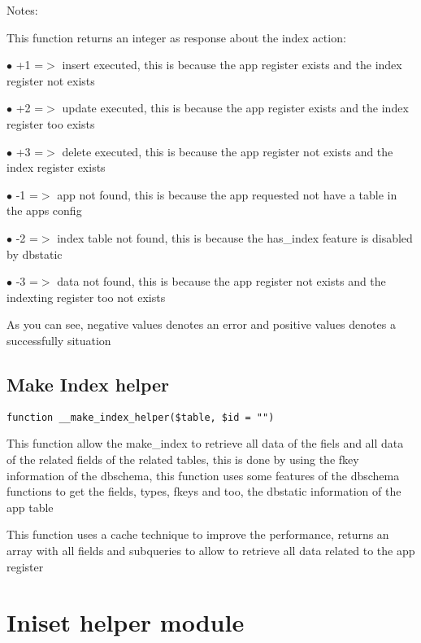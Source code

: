 \documentclass[a4paper]{book}
\begin{document}
Notes:

This function returns an integer as response about the index action:

\begin{compactitem}
\item[\color{myblue}$\bullet$] +1 =$>$ insert executed, this is because the app register exists and the index register not exists
\item[\color{myblue}$\bullet$] +2 =$>$ update executed, this is because the app register exists and the index register too exists
\item[\color{myblue}$\bullet$] +3 =$>$ delete executed, this is because the app register not exists and the index register exists
\item[\color{myblue}$\bullet$] -1 =$>$ app not found, this is because the app requested not have a table in the apps config
\item[\color{myblue}$\bullet$] -2 =$>$ index table not found, this is because the has\_index feature is disabled by dbstatic
\item[\color{myblue}$\bullet$] -3 =$>$ data not found, this is because the app register not exists and the indexting register too not exists
\end{compactitem}

As you can see, negative values denotes an error and positive values denotes a successfully situation

\hypertarget{toc187}{}
\subsection{Make Index helper}

\begin{lstlisting}
function __make_index_helper($table, $id = "")
\end{lstlisting}

This function allow the make\_index to retrieve all data of the fiels
and all data of the related fields of the related tables, this is done
by using the fkey information of the dbschema, this function uses some
features of the dbschema functions to get the fields, types, fkeys and
too, the dbstatic information of the app table

This function uses a cache technique to improve the performance, returns
an array with all fields and subqueries to allow to retrieve all data
related to the app register

\hypertarget{toc188}{}
\section{Iniset helper module}
\end{document}
